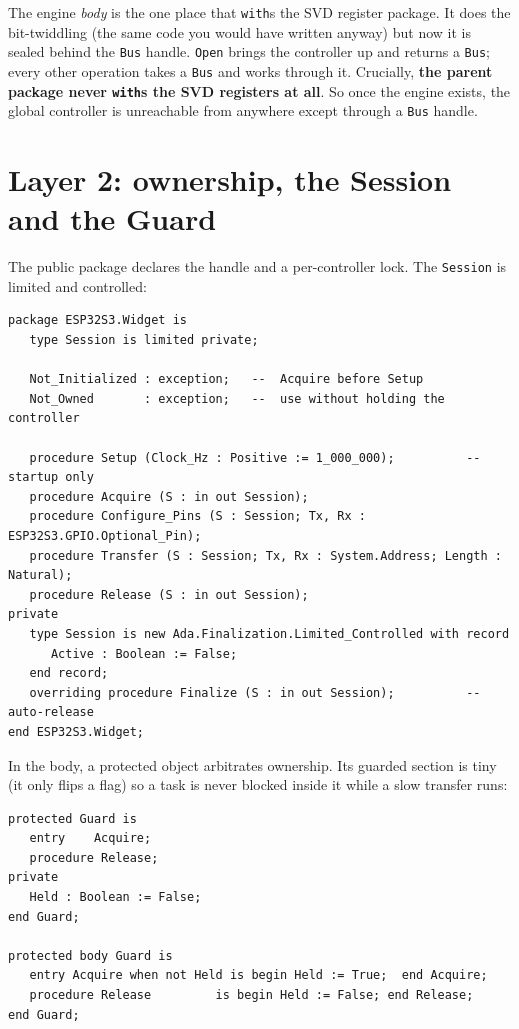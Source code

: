 The engine \emph{body} is the one place that \texttt{with}s the SVD register
package. It does the bit-twiddling (the same code you would have written
anyway) but now it is sealed behind the \texttt{Bus} handle. \texttt{Open}
brings the controller up and returns a \texttt{Bus}; every other operation takes a
\texttt{Bus} and works through it. Crucially, \textbf{the parent package never
\texttt{with}s the SVD registers at all}. So once the engine exists, the global
controller is unreachable from anywhere except through a \texttt{Bus} handle.

\section{Layer 2: ownership, the Session and the Guard}

The public package declares the handle and a per-controller lock. The
\texttt{Session} is limited and controlled:

\begin{lstlisting}
package ESP32S3.Widget is
   type Session is limited private;

   Not_Initialized : exception;   --  Acquire before Setup
   Not_Owned       : exception;   --  use without holding the controller

   procedure Setup (Clock_Hz : Positive := 1_000_000);          --  startup only
   procedure Acquire (S : in out Session);
   procedure Configure_Pins (S : Session; Tx, Rx : ESP32S3.GPIO.Optional_Pin);
   procedure Transfer (S : Session; Tx, Rx : System.Address; Length : Natural);
   procedure Release (S : in out Session);
private
   type Session is new Ada.Finalization.Limited_Controlled with record
      Active : Boolean := False;
   end record;
   overriding procedure Finalize (S : in out Session);          --  auto-release
end ESP32S3.Widget;
\end{lstlisting}

In the body, a protected object arbitrates ownership. Its guarded section is
tiny (it only flips a flag) so a task is never blocked inside it while a
slow transfer runs:

\begin{lstlisting}
protected Guard is
   entry    Acquire;
   procedure Release;
private
   Held : Boolean := False;
end Guard;

protected body Guard is
   entry Acquire when not Held is begin Held := True;  end Acquire;
   procedure Release         is begin Held := False; end Release;
end Guard;
\end{lstlisting}

